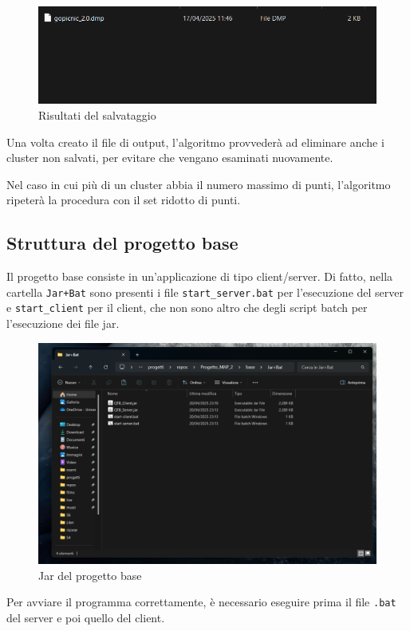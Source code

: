 \begin{figure}[h!]
    \centering
    \includegraphics[width = 0.5 \textwidth]{images/results.png}
    \caption{Risultati del salvataggio}
    
\end{figure}

Una volta creato il file di output, l'algoritmo provvederà ad eliminare anche i cluster non salvati, per evitare che vengano esaminati nuovamente. 

Nel caso in cui più di un cluster abbia il numero massimo di punti, l'algoritmo ripeterà la procedura con il set ridotto di punti. 

\subsection{Struttura del progetto base}

Il progetto base consiste in un'applicazione di tipo client/server. Di fatto, nella cartella \texttt{Jar+Bat} sono presenti i file \texttt{start\_server.bat} per l'esecuzione del server e \texttt{start\_client} per il client, che non sono altro che degli script batch per l'esecuzione dei file jar.

\begin{figure}[h!]
    \centering
    \includegraphics[width = 0.5 \textwidth]{images/file jar base.png}
    \caption{Jar del progetto base}
\end{figure}


\begin{tcolorbox}[  colback=white!5!white, colframe=gray, title={Avvertenza} ]

    Per avviare il programma correttamente, è necessario eseguire prima il file \texttt{.bat} del server e poi quello del client.
\end{tcolorbox}

